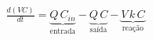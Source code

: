 \documentclass[preview]{standalone}
\begin{document}
\begin{align*}
\frac{d(VC)}{dt} = \underbrace{Q\,C_{in}}_{\text{entrada}} - \underbrace{Q\,C}_{\text{saída}} - \underbrace{V\,k\,C}_{\text{reação}}
\end{align*}
\end{document}
